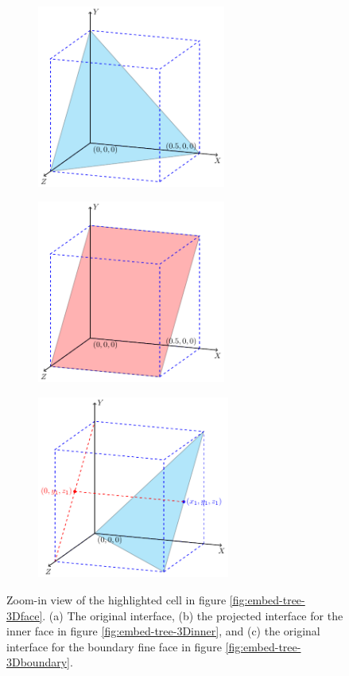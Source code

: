 \begin{figure}[ht]
    \centering
    \begin{subfigure}[b]{0.45\textwidth}
        \centering
        \includegraphics[height=6cm]{./image/embed-tree-h/fs_3D1.pdf}
        \subcaption{}
        \label{fig:embed-tree-3Dinner1}
    \end{subfigure}
    \begin{subfigure}[b]{0.45\textwidth}
        \centering
        \includegraphics[height=6cm]{./image/embed-tree-h/fs_3D2.pdf}
        \subcaption{}
        \label{fig:embed-tree-3Dinner2}
    \end{subfigure}
    \begin{subfigure}[b]{0.45\textwidth}
        \centering
        \includegraphics[height=6cm]{./image/embed-tree-h/fs_3D5.pdf}
        \subcaption{}
        \label{fig:embed-tree-3Dinner3}
    \end{subfigure}
    \caption{Zoom-in view of the highlighted cell in figure \ref{fig:embed-tree-3Dface}. (a) The original interface, (b) the projected interface for the inner face in figure \ref{fig:embed-tree-3Dinner}, and (c) the original interface for the boundary fine face in figure \ref{fig:embed-tree-3Dboundary}.}
    \label{fig:embed-tree-3DinnerZoom}
\end{figure}

